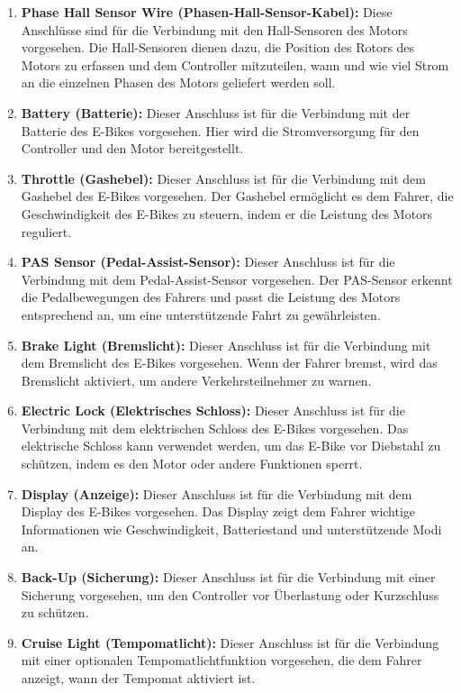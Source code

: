 \begin{enumerate}
\item \textbf{Phase Hall Sensor Wire (Phasen-Hall-Sensor-Kabel):} Diese Anschlüsse sind für die Verbindung mit den Hall-Sensoren des Motors vorgesehen. Die Hall-Sensoren dienen dazu, die Position des Rotors des Motors zu erfassen und dem Controller mitzuteilen, wann und wie viel Strom an die einzelnen Phasen des Motors geliefert werden soll.

\item \textbf{Battery (Batterie):} Dieser Anschluss ist für die Verbindung mit der Batterie des E-Bikes vorgesehen. Hier wird die Stromversorgung für den Controller und den Motor bereitgestellt.

\item \textbf{Throttle (Gashebel):} Dieser Anschluss ist für die Verbindung mit dem Gashebel des E-Bikes vorgesehen. Der Gashebel ermöglicht es dem Fahrer, die Geschwindigkeit des E-Bikes zu steuern, indem er die Leistung des Motors reguliert.

\item \textbf{PAS Sensor (Pedal-Assist-Sensor):} Dieser Anschluss ist für die Verbindung mit dem Pedal-Assist-Sensor vorgesehen. Der PAS-Sensor erkennt die Pedalbewegungen des Fahrers und passt die Leistung des Motors entsprechend an, um eine unterstützende Fahrt zu gewährleisten.

\item \textbf{Brake Light (Bremslicht):} Dieser Anschluss ist für die Verbindung mit dem Bremslicht des E-Bikes vorgesehen. Wenn der Fahrer bremst, wird das Bremslicht aktiviert, um andere Verkehrsteilnehmer zu warnen.

\item \textbf{Electric Lock (Elektrisches Schloss):} Dieser Anschluss ist für die Verbindung mit dem elektrischen Schloss des E-Bikes vorgesehen. Das elektrische Schloss kann verwendet werden, um das E-Bike vor Diebstahl zu schützen, indem es den Motor oder andere Funktionen sperrt.

\item \textbf{Display (Anzeige):} Dieser Anschluss ist für die Verbindung mit dem Display des E-Bikes vorgesehen. Das Display zeigt dem Fahrer wichtige Informationen wie Geschwindigkeit, Batteriestand und unterstützende Modi an.

\item \textbf{Back-Up (Sicherung):} Dieser Anschluss ist für die Verbindung mit einer Sicherung vorgesehen, um den Controller vor Überlastung oder Kurzschluss zu schützen.

\item \textbf{Cruise Light (Tempomatlicht):} Dieser Anschluss ist für die Verbindung mit einer optionalen Tempomatlichtfunktion vorgesehen, die dem Fahrer anzeigt, wann der Tempomat aktiviert ist.
\end{enumerate}

